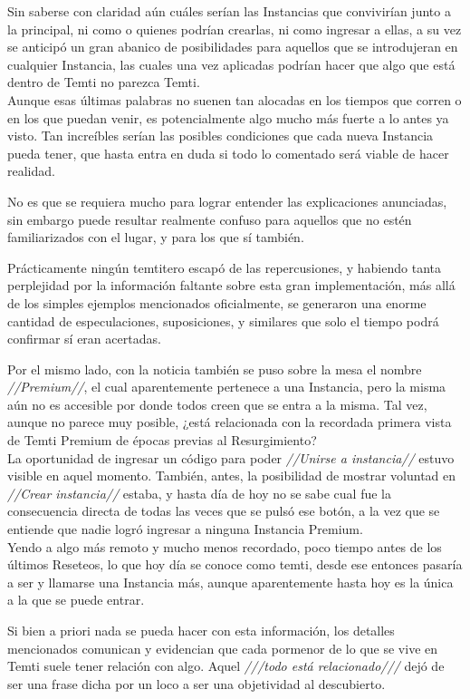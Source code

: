 \documentclass[
  spanish,
]{book}
\begin{document}
Sin saberse con claridad aún cuáles serían las Instancias que convivirían junto a la principal, ni como o quienes podrían crearlas, ni como ingresar a ellas, a su vez se anticipó un gran abanico de posibilidades para aquellos que se introdujeran en cualquier Instancia, las cuales una vez aplicadas podrían hacer que algo que está dentro de Temti no parezca Temti.\\
Aunque esas últimas palabras no suenen tan alocadas en los tiempos que corren o en los que puedan venir, es potencialmente algo mucho más fuerte a lo antes ya visto. Tan increíbles serían las posibles condiciones que cada nueva Instancia pueda tener, que hasta entra en duda si todo lo comentado será viable de hacer realidad.

No es que se requiera mucho para lograr entender las explicaciones anunciadas, sin embargo puede resultar realmente confuso para aquellos que no estén familiarizados con el lugar, y para los que sí también.

Prácticamente ningún temtitero escapó de las repercusiones, y habiendo tanta perplejidad por la información faltante sobre esta gran implementación, más allá de los simples ejemplos mencionados oficialmente, se generaron una enorme cantidad de especulaciones, suposiciones, y similares que solo el tiempo podrá confirmar sí eran acertadas.

Por el mismo lado, con la noticia también se puso sobre la mesa el nombre \emph{//Premium//}, el cual aparentemente pertenece a una Instancia, pero la misma aún no es accesible por donde todos creen que se entra a la misma. Tal vez, aunque no parece muy posible, ¿está relacionada con la recordada primera vista de Temti Premium de épocas previas al Resurgimiento?\\
La oportunidad de ingresar un código para poder \emph{//Unirse a instancia//} estuvo visible en aquel momento. También, antes, la posibilidad de mostrar voluntad en \emph{//Crear instancia//} estaba, y hasta día de hoy no se sabe cual fue la consecuencia directa de todas las veces que se pulsó ese botón, a la vez que se entiende que nadie logró ingresar a ninguna Instancia Premium.\\
Yendo a algo más remoto y mucho menos recordado, poco tiempo antes de los últimos Reseteos, lo que hoy día se conoce como temti, desde ese entonces pasaría a ser y llamarse una Instancia más, aunque aparentemente hasta hoy es la única a la que se puede entrar.

Si bien a priori nada se pueda hacer con esta información, los detalles mencionados comunican y evidencian que cada pormenor de lo que se vive en Temti suele tener relación con algo. Aquel \emph{///todo está relacionado///} dejó de ser una frase dicha por un loco a ser una objetividad al descubierto.
\end{document}
